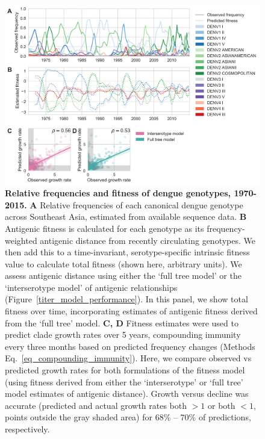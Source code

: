 \begin{figure}[h]
  \begin{centering}
\includegraphics[width=\linewidth]{./png/genotype-fitness.png}
    \caption{\textbf{Relative frequencies and fitness of dengue genotypes, 1970-2015.}
    \textbf{A} Relative frequencies of each canonical dengue genotype across Southeast Asia, estimated from available sequence data.
    \textbf{B} Antigenic fitness is calculated for each genotype as its frequency-weighted antigenic distance from recently circulating genotypes.
    We then add this to a time-invariant, serotype-specific intrinsic fitness value to calculate total fitness (shown here, arbitrary units).
    We assess antigenic distance using either the `full tree model' or the `interserotype model' of antigenic relationships (Figure~\ref{titer_model_performance}).
    In this panel, we show total fitness over time, incorporating estimates of antigenic fitness derived from the `full tree' model.
    \textbf{C, D}  Fitness estimates were used to predict clade growth rates over 5 years, compounding immunity every three months based on predicted frequency changes (Methods Eq.~\ref{eq_compounding_immunity}).
    Here, we compare observed vs predicted growth rates for both formulations of the fitness model (using fitness derived from either the `interserotype' or `full tree' model estimates of antigenic distance).
    Growth versus decline was accurate (predicted and actual growth rates both $> 1$ or both $< 1$, points outside the gray shaded area) for 68\% -- 70\% of predictions, respectively.
}
     \label{genotype_fitness}
   \end{centering}
\end{figure}

